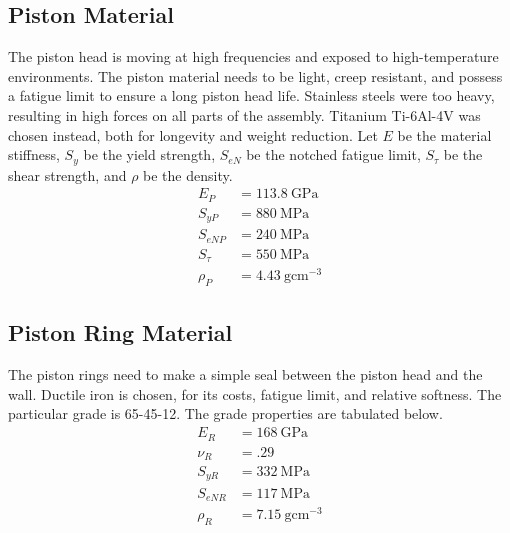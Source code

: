 \documentclass[10pt,a4paper]{article}
\begin{document}
\subsection*{Piston Material}
The piston head is moving at high frequencies and exposed to high-temperature environments. The piston material needs to be light, creep resistant, and possess a fatigue limit to ensure a long piston head life. Stainless steels were too heavy, resulting in high forces on all parts of the assembly. Titanium Ti-6Al-4V was chosen instead, both for longevity and weight reduction. Let $E$ be the material stiffness, $S_y$ be the yield strength, $S_{eN}$ be the notched fatigue limit, $S_{\tau}$ be the shear strength, and $\rho$ be the density. 
\begin{align}
	E_P &= 113.8\ \text{GPa}\nonumber \\
	S_{y P} &= 880\ \text{MPa}\nonumber \\
	S_{eN P} &= 240\ \text{MPa}\nonumber \\
	S_{\tau} &= 550\ \text{MPa}\nonumber \\
	\rho_P &= 4.43\ \text{g}\text{cm}^{-3}\nonumber 
\end{align}
\subsection*{Piston Ring Material}
The piston rings need to make a simple seal between the piston head and the wall. Ductile iron is chosen, for its costs, fatigue limit, and relative softness. The particular grade is 65-45-12. The grade properties are tabulated below.
\begin{align}
	E_R &= 168\ \text{GPa}\nonumber \\
	\nu_R &= .29\nonumber \\
	S_{y R} &= 332\ \text{MPa}\nonumber \\
	S_{eN R}&= 117\ \text{MPa}\nonumber \\ 
	\rho_R &= 7.15\ \text{g}\text{cm}^{-3}\nonumber 
\end{align}
\end{document}
